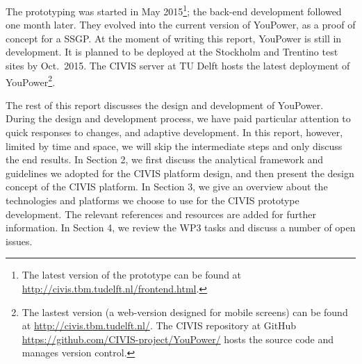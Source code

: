 The prototyping was started in May 2015\footnote{The latest version of the prototype can be found at \url{http://civis.tbm.tudelft.nl/frontend.html}.}; the back-end development followed one month later. They evolved into the current version of YouPower, as a proof of concept for a SSGP.  
At the moment of writing this report, YouPower is still in development. It is planned to be deployed at the Stockholm and Trentino test sites by Oct.~2015. 
The CIVIS server at TU Delft hosts the latest deployment of YouPower\footnote{The lastest version (a web-version designed for mobile screens) can be found at \url{http://civis.tbm.tudelft.nl/}. The CIVIS repository at GitHub \url{https://github.com/CIVIS-project/YouPower/} hosts the source code and manages version control.}.

The rest of this report discusses the design and development of YouPower. During the design and development process, we have paid particular attention to quick responses to changes, and adaptive development. In this report, however, limited by time and space, we will skip the intermediate steps and only discuss the end results. 
In Section 2, we first discuss the analytical framework and guidelines we adopted for the CIVIS platform design, and then present the design concept of the CIVIS platform. In Section 3, we give an overview about the technologies and platforms we choose to use for the CIVIS prototype development. The relevant references and resources are added for further information. In Section 4, we review the WP3 tasks and discuss a number of open issues. 

 
